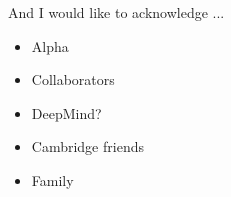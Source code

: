 
\begin{acknowledgements}

And I would like to acknowledge ...

\begin{itemize}
    \item Alpha
    \item Collaborators
    \item DeepMind?
    \item Cambridge friends
    \item Family
\end{itemize}

\end{acknowledgements}
